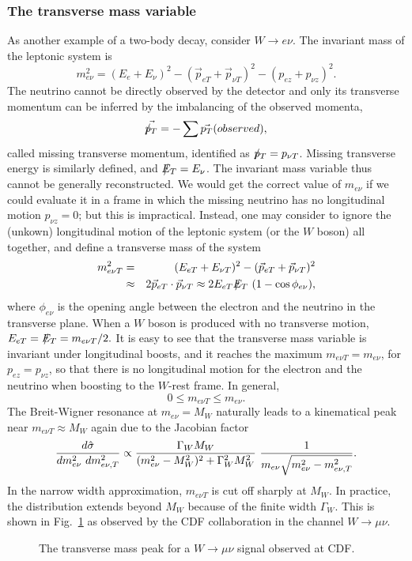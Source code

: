 \documentclass[prd,aps,floats,preprintnumbers,preprint,superscriptaddress,floatfix,nofootinbib]{revtex4}
\newcommand{ \slashchar }[1]{\setbox0=\hbox{$#1$}   %
   \dimen0=\wd0                                     %
   \setbox1=\hbox{/} \dimen1=\wd1                   %
   \ifdim\dimen0>\dimen1                            %
      \rlap{\hbox to \dimen0{\hfil/\hfil}}          %
      #1                                            %
   \else                                            %
      \rlap{\hbox to \dimen1{\hfil$#1$\hfil}}       %
      /                                             %
   \fi}                                             %
\def\ptmiss{\slashchar{p}_{T}}
\def\etmiss{\slashchar{E}_{T}}
\def\be{\begin{equation}}
\def\ee{\end{equation}}
\def\bea{\begin{eqnarray}}
\def\eea{\end{eqnarray}}
\begin{document}
\subsubsection{The transverse mass variable}

As another example of a two-body decay, consider  $W \to e\nu$.
The invariant mass of the leptonic system is
\be 
 m_{e\nu}^2 = (E_e + E_\nu)^2 - (\vec p_{eT} + \vec p_{\nu T})^2 
 - (p_{ez} + p_{\nu z})^2.
\ee
The neutrino cannot be directly observed by the detector and only
its transverse momentum can be inferred by the imbalancing 
of the observed momenta, 
\be
\vec{\ptmiss} = -\sum \vec {p_T}(observed), 
\ee
called missing transverse momentum, identified as 
$\ptmiss=p_{\nu T}$. Missing transverse energy is similarly defined,
and $\etmiss=E_\nu$. The invariant mass variable
thus cannot be generally reconstructed. We would get the correct value
of $m_{e\nu}$ if we could evaluate it in a frame in which
the missing neutrino has no longitudinal motion $p_{\nu z}=0$; but
this is impractical. Instead, one may consider to ignore the (unkown)
longitudinal motion of the leptonic system (or the $W$ boson) all
together, and define a transverse mass of the system \cite{MT}
\bea
 m_{e\nu T}^2 &=& (E_{eT} + E_{\nu T})^2 - (\vec p_{eT} + \vec p_{\nu T})^2 \\
&\approx& 2 \vec p_{eT} \cdot \vec p_{\nu T} \approx  2E_{eT} \etmiss\  (1-\cos\phi_{e\nu}),
\nonumber
\eea
where $\phi_{e\nu}$ is the opening angle between the electron and the neutrino
in the transverse plane. 
When a $W$ boson is produced with no transverse motion, 
 $E_{eT}= \etmiss = m_{e\nu T}/2.$
%
It is easy to see that the transverse mass variable is invariant under 
longitudinal boosts, and it reaches the maximum  $m_{e\nu T} = m_{e\nu}$, 
for $p_{ez} = p_{\nu z}$, so
that there is no longitudinal motion for the electron and the neutrino when
boosting to  the $W$-rest frame. In general, 
\be
0 \le m_{e\nu T} \le m_{e\nu} .
\ee
The Breit-Wigner resonance at $ m_{e\nu} = M_W$ naturally leads to
a kinematical peak near $m_{e\nu T} \approx M_W$ again due to the Jacobian
factor 
\be
{d\hat\sigma\over dm_{e\nu}^2\ dm^2_{e\nu, T} } \propto
\frac{\Gamma_WM_W}{ (m^2_{e\nu}-M^2_W)^2 + \Gamma_W^2 M_W^2}\ 
{ 1 \over m_{e\nu} \sqrt{ m_{e\nu}^2-m_{e\nu, T}^2}} .
\ee
In the narrow width approximation, $m_{e\nu T}$ is cut off sharply at  $M_W$.
In practice, the distribution extends beyond $M_W$ because of the finite
width $\Gamma_W$. This is shown in Fig.~\ref{MTW} 
as observed by the CDF collaboration \cite{cdf}
in the channel  $W\to \mu\nu$.
\begin{center}
\begin{figure}[tb]
\caption{The transverse mass peak for a $W\to \mu\nu$ signal 
observed at CDF.}
\label{MTW}
\end{figure}
\end{center}
\end{document}

